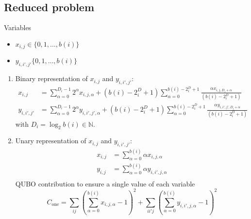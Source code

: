 \documentclass{article}
\begin{document}
\subsection{Reduced problem}
Variables
\begin{itemize}
    \item $x_{i, j} \in \{0, 1, \dots, b(i)\}$
    \item $y_{i, i', j'} \{0, 1, \dots, b(i)\}$
\end{itemize}
\begin{enumerate}
    \item 
    Binary representation of $x_{i, j}$ and $y_{i, i', j'}$:
    \begin{align*}
        x_{i, j} & = \sum_{\alpha = 0}^{D_i - 1} 2^\alpha x_{i, j, \alpha} + (b(i) - 2^D_i + 1) \sum_{\alpha=0}^{b(i) - 2^D_i + 1} \frac{\alpha x_{i, j, D_i + \alpha}}{(b(i) - 2^D_i + 1)} \\
        y_{i, i', j'} & = \sum_{\alpha = 0}^{D_i - 1} 2^\alpha y_{i, i', j', \alpha} + (b(i) - 2^D_i + 1) \sum_{\alpha=0}^{b(i) - 2^D_i + 1} \frac{\alpha y_{i, i', j', D_i + \alpha}}{(b(i) - 2^D_i + 1)}
    \end{align*}
    with $D_i = \log_2 b(i) \in \mathbb{N}$.
    \item 
    Unary representation of $x_{i, j}$ and $y_{i, i', j'}$:
    \begin{align*}
        x_{i, j} & = \sum_{\alpha = 0}^{b(i)} \alpha x_{i, j, \alpha} \\
        y_{i, j} & = \sum_{\alpha = 0}^{b(i)} \alpha y_{i, i', j, \alpha} \\
    \end{align*}
    \noindent
    QUBO contribution to ensure a single value of each variable
    \begin{equation*}
        C_\text{one} = \sum_{ij} \left( \sum_{\alpha = 0}^{b(i)} x_{i, j, \alpha} - 1 \right)^2
                     + \sum_{ii'j} \left( \sum_{\alpha = 0}^{b(i)} y_{i, i', j, \alpha} - 1 \right)^2
    \end{equation*}
\end{enumerate}
\end{document}
